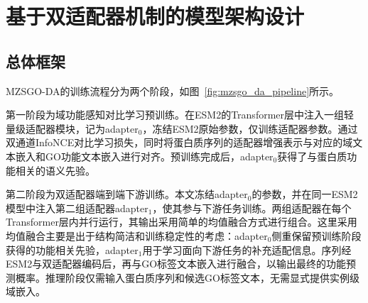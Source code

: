 \section{基于双适配器机制的模型架构设计}

\subsection{总体框架}

MZSGO-DA的训练流程分为两个阶段，如图~\ref{fig:mzsgo_da_pipeline}所示。

第一阶段为域功能感知对比学习预训练。在ESM2的Transformer层中注入一组轻量级适配器模块，记为adapter$_0$，冻结ESM2原始参数，仅训练适配器参数。通过双通道InfoNCE对比学习损失，同时将蛋白质序列的适配器增强表示与对应的域文本嵌入和GO功能文本嵌入进行对齐。预训练完成后，adapter$_0$获得了与蛋白质功能相关的语义先验。

第二阶段为双适配器端到端下游训练。本文冻结adapter$_0$的参数，并在同一ESM2模型中注入第二组适配器adapter$_1$，使其参与下游任务训练。两组适配器在每个Transformer层内并行运行，其输出采用简单的均值融合方式进行组合。这里采用均值融合主要是出于结构简洁和训练稳定性的考虑：adapter$_0$侧重保留预训练阶段获得的功能相关先验，adapter$_1$用于学习面向下游任务的补充适配信息。序列经ESM2与双适配器编码后，再与GO标签文本嵌入进行融合，以输出最终的功能预测概率。推理阶段仅需输入蛋白质序列和候选GO标签文本，无需显式提供实例级域嵌入。

